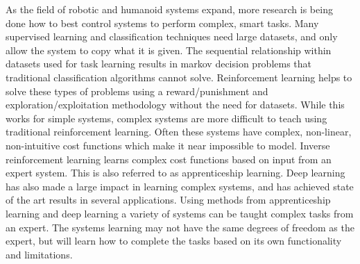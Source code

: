 \documentclass[12pt,american]{report}
\begin{document}
\begin{abstractpage}
As the field of robotic and humanoid systems expand, more research is being done how to best control systems to perform complex, smart tasks. Many supervised learning and classification techniques need large datasets, and only allow the system to copy what it is given. The sequential relationship within datasets used for task learning results in markov decision problems that traditional classification algorithms cannot solve. Reinforcement learning helps to solve these types of problems using a reward/punishment and exploration/exploitation methodology without the need for datasets. While this works for simple systems, complex systems are more difficult to teach using traditional reinforcement learning. Often these systems have complex, non-linear, non-intuitive cost functions which make it near impossible to model.  Inverse reinforcement learning learns complex cost functions based on input from an expert system.  This is also referred to as apprenticeship learning. Deep learning has also made a large impact in learning complex systems, and has achieved state of the art results in several applications.  Using methods from apprenticeship learning and deep learning a variety of systems can be taught complex tasks from an expert. The systems learning may not have the same degrees of freedom as the expert, but will learn how to complete the tasks based on its own functionality and limitations.
\end{abstractpage}



\afterpreface%


\body%
\end{document}
